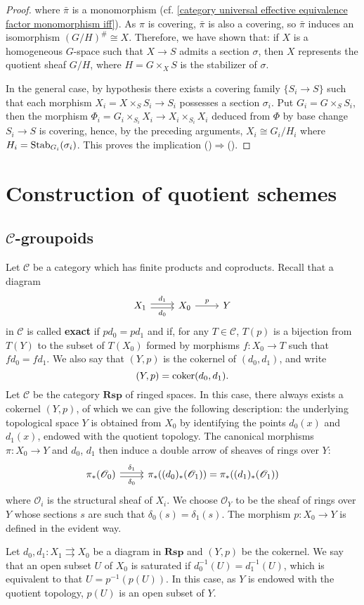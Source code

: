 \begin{proof}
where $\bar{\pi}$ is a monomorphism (cf. \cref{category universal effective equivalence factor monomorphism iff}). As $\pi$ is covering, $\bar{\pi}$ is also a covering, so $\bar{\pi}$ induces an isomorphism $(G/H)^\#\cong X$. Therefore, we have shown that: if $X$ is a homogeneous $G$-space such that $X\to S$ admits a section $\sigma$, then $X$ represents the quotient sheaf $G/H$, where $H=G\times_XS$ is the stabilizer of $\sigma$.\par
In the general case, by hypothesis there exists a covering family $\{S_i\to S\}$ such that each morphism $X_i=X\times_SS_i\to S_i$ possesses a section $\sigma_i$. Put $G_i=G\times_SS_i$, then the morphism $\Phi_i=G_i\times_{S_i}X_i\to X_i\times_{S_i}X_i$ deduced from $\Phi$ by base change $S_i\to S$ is covering, hence, by the preceding arguments, $X_i\cong G_i/H_i$ where $H_i=\mathrm{Stab}_{G_i}(\sigma_i)$. This proves the implication ()$\Rightarrow$().
\end{proof}

\section{Construction of quotient schemes}
\subsection{\texorpdfstring{$\mathcal{C}$}{C}-groupoids}
Let $\mathcal{C}$ be a category which has finite products and coproducts. Recall that a diagram
\[\begin{tikzcd}
X_1\ar[r,shift left=2pt,"d_1"]\ar[r,shift right=2pt,swap,"d_0"]&X_0\ar[r,"p"]&Y
\end{tikzcd}\]
in $\mathcal{C}$ is called \textbf{exact} if $pd_0=pd_1$ and if, for any $T\in\mathcal{C}$, $T(p)$ is a bijection from $T(Y)$ to the subset of $T(X_0)$ formed by morphisms $f:X_0\to T$ such that $fd_0=fd_1$. We also say that $(Y,p)$ is the cokernel of $(d_0,d_1)$, and write
\[(Y,p)=\operatorname{coker}(d_0,d_1).\]
Let $\mathcal{C}$ be the category $\mathbf{Rsp}$ of ringed spaces. In this case, there always exists a cokernel $(Y,p)$, of which we can give the following description: the underlying topological space $Y$ is obtained from $X_0$ by identifying the points $d_0(x)$ and $d_1(x)$, endowed with the quotient topology. The canonical morphisms $\pi:X_0\to Y$ and $d_0$, $d_1$ then induce a double arrow of sheaves of rings over $Y$:
\[\begin{tikzcd}
\pi_*(\mathscr{O}_{0})\ar[r,shift left=2pt,"\delta_1"]\ar[r,shift right=2pt,swap,"\delta_0"]&\pi_*((d_0)_*(\mathscr{O}_{1}))=\pi_*((d_1)_*(\mathscr{O}_{1}))
\end{tikzcd}\]
where $\mathscr{O}_i$ is the structural sheaf of $X_i$. We choose $\mathscr{O}_Y$ to be the sheaf of rings over $Y$ whose sections $s$ are such that $\delta_0(s)=\delta_1(s)$. The morphism $p:X_0\to Y$ is defined in the evident way.\par
Let $d_0,d_1:X_1\rightrightarrows X_0$ be a diagram in $\mathbf{Rsp}$ and $(Y,p)$ be the cokernel. We say that an open subset $U$ of $X_0$ is saturated if $d_0^{-1}(U)=d_1^{-1}(U)$, which is equivalent to that $U=p^{-1}(p(U))$. In this case, as $Y$ is endowed with the quotient topology, $p(U)$ is an open subset of $Y$.

